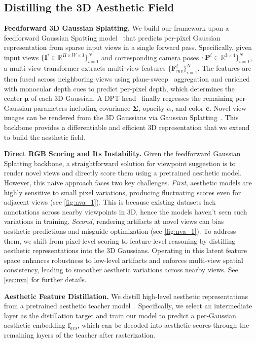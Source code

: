 \subsection{Distilling the 3D Aesthetic Field}\label{sec:distill}
\textbf{Feedforward 3D Gaussian Splatting.}
We build our framework upon a feedforward Gaussian Spatting model~\cite{depthsplat} that predicts per-pixel Gaussian representation from sparse input views in a single forward pass. Specifically, given input views $\{\mathbf I^i\in\mathbb{R}^{H\times W\times 3}\}_{i=1}^N$ and corresponding camera poses $\{\mathbf P^i\in\mathbb{R}^{3\times 4}\}_{i=1}^N$, a multi-view transformer extracts multi-view features $\{\mathbf F^i_{mv}\}_{i=1}^N$. The features are then fused across neighboring views using plane-sweep~\cite{collins1996space,xu2023unifying} aggregation and enriched with monocular depth cues to predict per-pixel depth, which determines the center $\boldsymbol{\mu}$ of each 3D Gaussian. A DPT head~\cite{dpt} finally regresses the remaining per-Gaussian parameters including covariance $\boldsymbol\Sigma$, opacity $\alpha$, and color $\mathbf c$. Novel view images can be rendered from the 3D Gaussians via Gaussian Splatting~\cite{kerbl20233d}.
This backbone provides a differentiable and efficient 3D representation that we extend to build the aesthetic field.

\noindent\textbf{Direct RGB Scoring and Its Instability.}
Given the feedforward Gaussian Splatting backbone, a straightforward solution for viewpoint suggestion is to render novel views and directly score them using a pretrained aesthetic model.
However, this naive approach faces two key challenges.
\textit{First}, aesthetic models are highly sensitive to small pixel variations, producing fluctuating scores even for adjacent views (see \cref{fig:nva_1}). This is because existing datasets lack annotations across nearby viewpoints in 3D, hence the models haven't seen such variations in training.
\textit{Second}, rendering artifacts at novel views can bias aesthetic predictions and misguide optimization (see \cref{fig:nva_1}).
To address them, we shift from pixel-level scoring to feature-level reasoning by distilling aesthetic representations into the 3D Gaussians.
Operating in this latent feature space enhances robustness to low-level artifacts and enforces multi-view spatial consistency, leading to smoother aesthetic variations across nearby views. See \cref{sec:nva} for further details.

\noindent\textbf{Aesthetic Feature Distillation.}
We distill high-level aesthetic representations from a pretrained aesthetic teacher model~\cite{wei2018good}.
Specifically, we select an intermediate layer as the distillation target and train our model to predict a per-Gaussian aesthetic embedding $\mathbf f_{aes}$, which can be decoded into aesthetic scores through the remaining layers of the teacher after rasterization.

